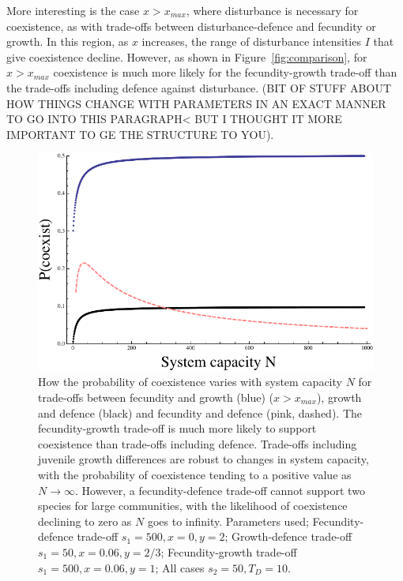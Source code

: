 \documentclass[a4paper]{article}
\begin{document}
More interesting is the case $x>x_{max}$, where disturbance is necessary for coexistence, as with trade-offs between disturbance-defence and fecundity or growth. In this region, as $x$ increases, the range of disturbance intensities $I$ that give coexistence decline. However, as shown in Figure~\ref{fig:comparison}, for $x>x_{max}$ coexistence is much more likely for the fecundity-growth trade-off than the trade-offs including defence against disturbance. (BIT OF STUFF ABOUT HOW THINGS CHANGE WITH PARAMETERS IN AN EXACT MANNER TO GO INTO THIS PARAGRAPH< BUT I THOUGHT IT MORE IMPORTANT TO GE THE STRUCTURE TO YOU).
\begin{figure}
  \includegraphics[width=4.5in]{Systemsizechanges.pdf}
   \caption{How the probability of coexistence varies with system capacity $N$ for trade-offs between fecundity and growth (blue) ($x>x_{max}$), growth and defence (black) and fecundity and defence (pink, dashed). The fecundity-growth trade-off is much more likely to support coexistence than trade-offs including defence. Trade-offs including juvenile growth differences are robust to changes in system capacity, with the probability of coexistence tending to a positive value as $N \to \infty$. However, a fecundity-defence trade-off cannot support two species for large communities, with the likelihood of coexistence declining to zero as $N$ goes to infinity. Parameters used; Fecundity-defence trade-off $s_1=500,x=0,y=2$; Growth-defence trade-off $s_1=50,x=0.06,y=2/3$; Fecundity-growth trade-off $s_1=500,x=0.06,y=1$; All cases $s_2=50, T_D=10$.}
 \label{fig:systemsize}
\end{figure}
\end{document}
